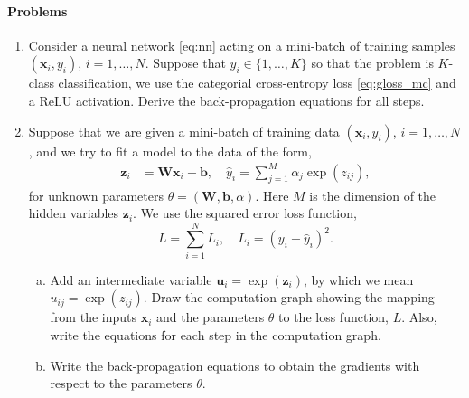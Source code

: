 \documentclass[11pt]{article}
\newcommand{\bbf}{\mathbf{b}}
\newcommand{\ubf}{\mathbf{u}}
\newcommand{\xbf}{\mathbf{x}}
\newcommand{\zbf}{\mathbf{z}}
\newcommand{\Wbf}{\mathbf{W}}
\begin{document}
\paragraph*{Problems}
\begin{enumerate}
\item Consider a neural network \eqref{eq:nn} acting on
a mini-batch of training samples $(\xbf_i,y_i)$, $i=1,\ldots,N$.  Suppose that $y_i \in \{1,\ldots,K\}$ so that the problem
is $K$-class classification, we use the categorial cross-entropy loss \eqref{eq:gloss_mc} and a ReLU activation.
Derive the back-propagation equations for all steps.

\item \label{prob:cg_exp}
Suppose that we are given a mini-batch of training data $(\xbf_i,y_i)$, $i=1,\ldots,N$, 
and we try to fit a model to the data of the form,
\begin{align*}
    \zbf_i    &= \Wbf\xbf_i + \bbf, \quad
    \hat{y}_i = \sum_{j=1}^M \alpha_j\exp(z_{ij}),
\end{align*}
for unknown parameters $\theta=(\Wbf,\bbf,\alpha)$.  Here $M$ is the dimension
of the hidden variables $\zbf_i$.  We use the squared error loss function,
\[
    L = \sum_{i=1}^N L_i, \quad L_i = (y_i-\hat{y}_i)^2.
\]
\begin{enumerate}[(a)]
\item Add an intermediate variable $\ubf_i = \exp(\zbf_i)$, by which we mean
$u_{ij} = \exp(z_{ij})$.  Draw the computation graph showing the mapping
from the inputs $\xbf_i$ and the parameters $\theta$ to the loss function, $L$.
Also, write the equations for each step in the computation graph.

\item Write the back-propagation equations to obtain the 
gradients with respect to the parameters $\theta$.
\end{enumerate}


\end{enumerate}
\end{document}
